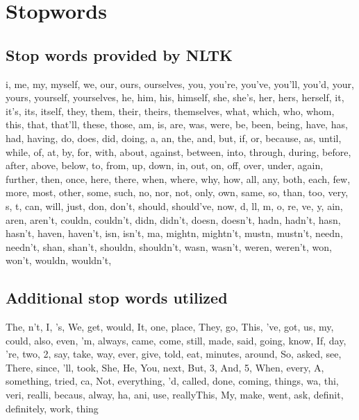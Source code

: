 \documentclass[sigconf]{acmart}
\begin{document}



\appendix
\section{Stopwords}
\subsection{Stop words provided by NLTK}
i, me, my, myself, we, our, ours, ourselves, you, you're, you've, you'll, you'd, your, yours, yourself, yourselves, he, him, his, himself, she, she's, her, hers, herself, it, it's, its, itself, they, them, their, theirs, themselves, what, which, who, whom, this, that, that'll, these, those, am, is, are, was, were, be, been, being, have, has, had, having, do, does, did, doing, a, an, the, and, but, if, or, because, as, until, while, of, at, by, for, with, about, against, between, into, through, during, before, after, above, below, to, from, up, down, in, out, on, off, over, under, again, further, then, once, here, there, when, where, why, how, all, any, both, each, few, more, most, other, some, such, no, nor, not, only, own, same, so, than, too, very, s, t, can, will, just, don, don't, should, should've, now, d, ll, m, o, re, ve, y, ain, aren, aren't, couldn, couldn't, didn, didn't, doesn, doesn't, hadn, hadn't, hasn, hasn't, haven, haven't, isn, isn't, ma, mightn, mightn't, mustn, mustn't, needn, needn't, shan, shan't, shouldn, shouldn't, wasn, wasn't, weren, weren't, won, won't, wouldn, wouldn't, 

\subsection{Additional stop words utilized}
The, n't, I, 's, We, get, would, It, one, place, They, go, This, 've, got, us, my, could, also, even, 'm, always, came, come, still, made, said, going, know, If, day, 're, two, 2, say, take, way, ever, give, told, eat, minutes, around, So, asked, see, There, since, 'll, took, She, He, You, next, But, 3, And, 5, When, every, A, something, tried, ca, Not, everything, 'd, called, done, coming, things, wa, thi, veri, realli, becaus, alway, ha, ani, use, reallyThis, My, make, went, ask, definit, definitely, work, thing
\end{document}
